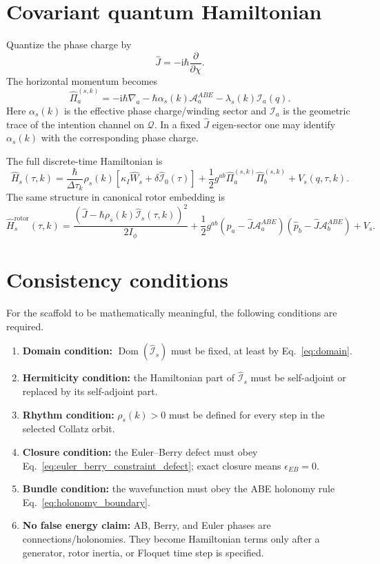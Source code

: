 \documentclass[11pt,a4paper]{article}
\newcommand{\ii}{\mathrm i}
\newcommand{\Q}{\mathcal Q}
\newcommand{\Abe}{\mathcal A^{ABE}}
\newcommand{\Iop}{\hat{\mathcal I}}
\newcommand{\Wop}{\hat W}
\newcommand{\Jop}{\hat J}
\newcommand{\Hs}{\hat H_s}
\newcommand{\kappaI}{\kappa_I}
\newcommand{\epsEB}{\epsilon_{EB}}
\newcommand{\Dom}{\operatorname{Dom}}
\begin{document}
\section{Covariant quantum Hamiltonian}

Quantize the phase charge by
\begin{equation}
  \Jop=-\ii\hbar\frac{\partial}{\partial\chi}.
\end{equation}
The horizontal momentum becomes
\begin{equation}
\boxed{
  \hat\Pi_a^{(s,k)}
  =-\ii\hbar\nabla_a
  -\hbar\alpha_s(k)\Abe_a
  -\lambda_s(k)\mathcal I_a(q).}
  \label{eq:quantum_cov_momentum}
\end{equation}
Here $\alpha_s(k)$ is the effective phase charge/winding sector and $\mathcal I_a$ is the geometric trace of the intention channel on $\Q$. In a fixed $\Jop$ eigen-sector one may identify $\alpha_s(k)$ with the corresponding phase charge.

The full discrete-time Hamiltonian is
\begin{equation}
\boxed{
\Hs(\tau,k)=
\frac{\hbar}{\Delta\tau_k}\rho_s(k)
\left[\kappaI\Wop_s+\delta\Iop_0(\tau)\right]
+
\frac12 g^{ab}\hat\Pi_a^{(s,k)}\hat\Pi_b^{(s,k)}
+V_s(q,\tau,k).}
\end{equation}
The same structure in canonical rotor embedding is
\begin{equation}
\boxed{
\Hs^{\mathrm{rotor}}(\tau,k)=
\frac{(\Jop-\hbar\rho_s(k)\Iop_s(\tau,k))^2}{2I_\phi}
+
\frac12 g^{ab}(\hat p_a-\Jop\Abe_a)(\hat p_b-\Jop\Abe_b)
+V_s.}
\end{equation}

\section{Consistency conditions}

For the scaffold to be mathematically meaningful, the following conditions are required.

\begin{enumerate}[leftmargin=*]
  \item \textbf{Domain condition:} $\Dom(\Iop_s)$ must be fixed, at least by Eq.~\eqref{eq:domain}.
  \item \textbf{Hermiticity condition:} the Hamiltonian part of $\Iop_s$ must be self-adjoint or replaced by its self-adjoint part.
  \item \textbf{Rhythm condition:} $\rho_s(k)>0$ must be defined for every step in the selected Collatz orbit.
  \item \textbf{Closure condition:} the Euler--Berry defect must obey Eq.~\eqref{eq:euler_berry_constraint_defect}; exact closure means $\epsEB=0$.
  \item \textbf{Bundle condition:} the wavefunction must obey the ABE holonomy rule Eq.~\eqref{eq:holonomy_boundary}.
  \item \textbf{No false energy claim:} AB, Berry, and Euler phases are connections/holonomies. They become Hamiltonian terms only after a generator, rotor inertia, or Floquet time step is specified.
\end{enumerate}
\end{document}
